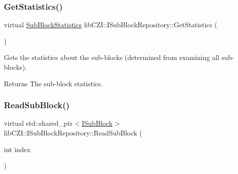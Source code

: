 \subsubsection{\texorpdfstring{Get\+Statistics()}{GetStatistics()}}
{\footnotesize\ttfamily virtual \hyperlink{structlib_c_z_i_1_1_sub_block_statistics}{Sub\+Block\+Statistics} lib\+C\+Z\+I\+::\+I\+Sub\+Block\+Repository\+::\+Get\+Statistics (\begin{DoxyParamCaption}{ }\end{DoxyParamCaption})\hspace{0.3cm}{\ttfamily [pure virtual]}}

Gets the statistics about the sub-\/blocks (determined from examining all sub-\/blocks). \begin{DoxyReturn}{Returns}
The sub-\/block statistics. 
\end{DoxyReturn}
\mbox{\label{classlib_c_z_i_1_1_i_sub_block_repository_afd2d9c375554492cf499c97ae49aa50b}} 
\subsubsection{\texorpdfstring{Read\+Sub\+Block()}{ReadSubBlock()}}
{\footnotesize\ttfamily virtual std\+::shared\+\_\+ptr$<$\hyperlink{classlib_c_z_i_1_1_i_sub_block}{I\+Sub\+Block}$>$ lib\+C\+Z\+I\+::\+I\+Sub\+Block\+Repository\+::\+Read\+Sub\+Block (\begin{DoxyParamCaption}\item[{int}]{index }\end{DoxyParamCaption})\hspace{0.3cm}{\ttfamily [pure virtual]}}

